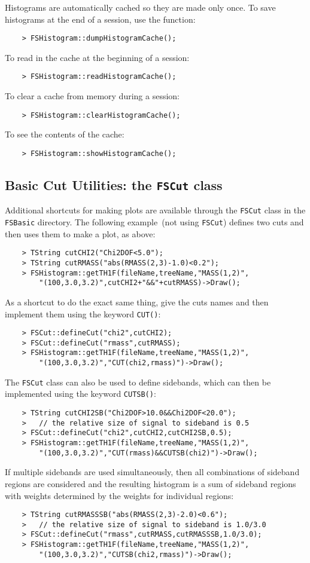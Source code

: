 \documentclass[11pt]{article}
\begin{document}
Histograms are automatically cached so they are made only once.  To save histograms at the end of a session, use the function:
\begin{verbatim}
    > FSHistogram::dumpHistogramCache(); 
\end{verbatim}
To read in the cache at the beginning of a session:
\begin{verbatim}
    > FSHistogram::readHistogramCache(); 
\end{verbatim}
To clear a cache from memory during a session:
\begin{verbatim}
    > FSHistogram::clearHistogramCache(); 
\end{verbatim}
To see the contents of the cache:
\begin{verbatim}
    > FSHistogram::showHistogramCache(); 
\end{verbatim}

\subsection{Basic Cut Utilities: the {\tt FSCut} class}
\label{sec:cut}

Additional shortcuts for making plots are available through the {\tt FSCut} class in the {\tt FSBasic} directory.  The following example~(not using {\tt FSCut}) defines two cuts and then uses them to make a plot, as above:
\begin{verbatim}
    > TString cutCHI2("Chi2DOF<5.0");
    > TString cutRMASS("abs(RMASS(2,3)-1.0)<0.2");
    > FSHistogram::getTH1F(fileName,treeName,"MASS(1,2)",
        "(100,3.0,3.2)",cutCHI2+"&&"+cutRMASS)->Draw();
\end{verbatim}
As a shortcut to do the exact same thing, give the cuts names and then implement them using the keyword {\tt CUT()}:
\begin{verbatim}
    > FSCut::defineCut("chi2",cutCHI2);
    > FSCut::defineCut("rmass",cutRMASS);
    > FSHistogram::getTH1F(fileName,treeName,"MASS(1,2)",
        "(100,3.0,3.2)","CUT(chi2,rmass)")->Draw();
\end{verbatim}
The {\tt FSCut} class can also be used to define sidebands, which can then be implemented using the keyword {\tt CUTSB()}:
\begin{verbatim}
    > TString cutCHI2SB("Chi2DOF>10.0&&Chi2DOF<20.0");
    >   // the relative size of signal to sideband is 0.5
    > FSCut::defineCut("chi2",cutCHI2,cutCHI2SB,0.5);
    > FSHistogram::getTH1F(fileName,treeName,"MASS(1,2)",
        "(100,3.0,3.2)","CUT(rmass)&&CUTSB(chi2)")->Draw();
\end{verbatim}
If multiple sidebands are used simultaneously, then all combinations of sideband regions are considered and the resulting histogram is a sum of sideband regions with weights determined by the weights for individual regions:
\begin{verbatim}
    > TString cutRMASSSB("abs(RMASS(2,3)-2.0)<0.6");
    >   // the relative size of signal to sideband is 1.0/3.0
    > FSCut::defineCut("rmass",cutRMASS,cutRMASSSB,1.0/3.0);
    > FSHistogram::getTH1F(fileName,treeName,"MASS(1,2)",
        "(100,3.0,3.2)","CUTSB(chi2,rmass)")->Draw();
\end{verbatim}
\end{document}
